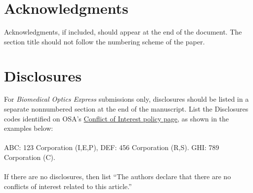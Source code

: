 \documentclass[10pt]{article}
\begin{document}
\section*{Acknowledgments}
Acknowledgments, if included, should appear at the end of the document. The section title should not follow the numbering scheme of the paper.

\section*{Disclosures}
For \textit{Biomedical Optics Express} submissions only, disclosures should be listed in a separate nonnumbered section at the end of the manuscript. List the Disclosures codes identified on OSA's \href{http://www.osapublishing.org/submit/review/conflicts-interest-policy.cfm}{Conflict of Interest policy page}, as shown in the examples below:\\
\\
ABC: 123 Corporation (I,E,P), DEF: 456 Corporation (R,S). GHI: 789 Corporation (C).\\
\\
If there are no disclosures, then list ``The authors declare that there are no conflicts of interest related to this article.''
\end{document}
